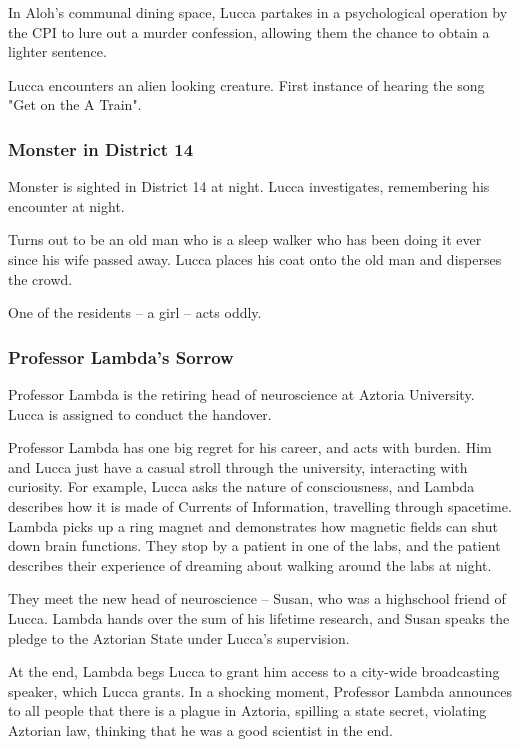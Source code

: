 \documentclass[11pt]{article}
\begin{document}
		In Aloh's communal dining space, Lucca partakes in a psychological operation by the CPI to lure out a murder confession, allowing them the chance to obtain a lighter sentence. 
		
		Lucca encounters an alien looking creature.
		First instance of hearing the song "Get on the A Train".

		\subsubsection{Monster in District 14}
		Monster is sighted in District 14 at night.
		Lucca investigates, remembering his encounter at night. 
		
		Turns out to be an old man who is a sleep walker who has been doing it ever since his wife passed away. 
		Lucca places his coat onto the old man and disperses the crowd.
		
		One of the residents – a girl – acts oddly.
		
		\subsubsection{Professor Lambda's Sorrow}
		Professor Lambda is the retiring head of neuroscience at Aztoria University. 
		Lucca is assigned to conduct the handover. 
		
		Professor Lambda has one big regret for his career, and acts with burden. 
		Him and Lucca just have a casual stroll through the university, interacting with curiosity. For example, Lucca asks the nature of consciousness, and Lambda describes how it is made of Currents of Information, travelling through spacetime. Lambda picks up a ring magnet and demonstrates how magnetic fields can shut down brain functions.
		They stop by a patient in one of the labs, and the patient describes their experience of dreaming about walking around the labs at night.
		
		They meet the new head of neuroscience – Susan, who was a highschool friend of Lucca. 
		Lambda hands over the sum of his lifetime research, and Susan speaks the pledge to the Aztorian State under Lucca’s supervision. 
		
		At the end, Lambda begs Lucca to grant him access to a city-wide broadcasting speaker, which Lucca grants. 
		In a shocking moment, Professor Lambda announces to all people that there is a plague in Aztoria, spilling a state secret, violating Aztorian law, thinking that he was a good scientist in the end.
		
\end{document}

